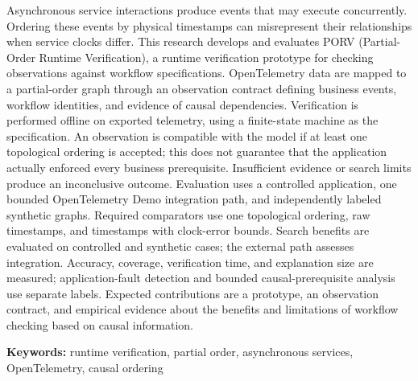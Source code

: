 \documentclass[proposal,indonesia]{ugmskripsi}
\begin{document}
\abstracteng
Asynchronous service interactions produce events that may execute concurrently. Ordering these events by physical timestamps can misrepresent their relationships when service clocks differ. This research develops and evaluates PORV (Partial-Order Runtime Verification), a runtime verification prototype for checking observations against workflow specifications. OpenTelemetry data are mapped to a partial-order graph through an observation contract defining business events, workflow identities, and evidence of causal dependencies. Verification is performed offline on exported telemetry, using a finite-state machine as the specification. An observation is compatible with the model if at least one topological ordering is accepted; this does not guarantee that the application actually enforced every business prerequisite. Insufficient evidence or search limits produce an inconclusive outcome. Evaluation uses a controlled application, one bounded OpenTelemetry Demo integration path, and independently labeled synthetic graphs. Required comparators use one topological ordering, raw timestamps, and timestamps with clock-error bounds. Search benefits are evaluated on controlled and synthetic cases; the external path assesses integration. Accuracy, coverage, verification time, and explanation size are measured; application-fault detection and bounded causal-prerequisite analysis use separate labels. Expected contributions are a prototype, an observation contract, and empirical evidence about the benefits and limitations of workflow checking based on causal information.

\vspace{0.5cm}
\noindent\textbf{Keywords:} runtime verification, partial order, asynchronous services, OpenTelemetry, causal ordering
\endabstracteng





\end{document}

